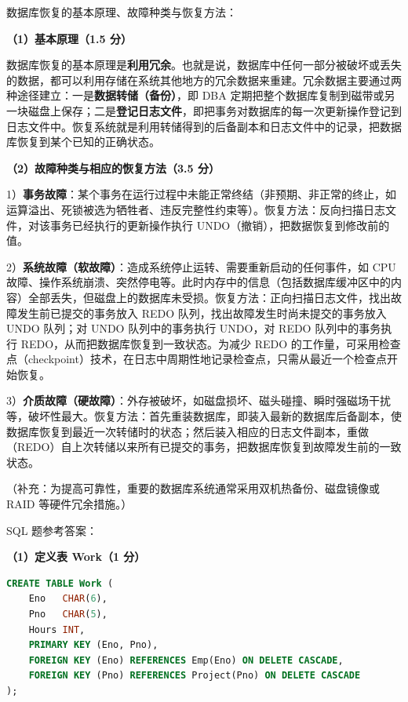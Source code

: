 \documentclass[a4paper,11pt]{article}
\begin{document}
\q 数据库恢复的基本原理、故障种类与恢复方法：
\begin{analysis}
\textbf{（1）基本原理（1.5 分）}

数据库恢复的基本原理是\textbf{利用冗余}。也就是说，数据库中任何一部分被破坏或丢失的数据，都可以利用存储在系统其他地方的冗余数据来重建。冗余数据主要通过两种途径建立：一是\textbf{数据转储（备份）}，即 DBA 定期把整个数据库复制到磁带或另一块磁盘上保存；二是\textbf{登记日志文件}，即把事务对数据库的每一次更新操作登记到日志文件中。恢复系统就是利用转储得到的后备副本和日志文件中的记录，把数据库恢复到某个已知的正确状态。

\textbf{（2）故障种类与相应的恢复方法（3.5 分）}

1）\textbf{事务故障}：某个事务在运行过程中未能正常终结（非预期、非正常的终止，如运算溢出、死锁被选为牺牲者、违反完整性约束等）。恢复方法：反向扫描日志文件，对该事务已经执行的更新操作执行 UNDO（撤销），把数据恢复到修改前的值。

2）\textbf{系统故障（软故障）}：造成系统停止运转、需要重新启动的任何事件，如 CPU 故障、操作系统崩溃、突然停电等。此时内存中的信息（包括数据库缓冲区中的内容）全部丢失，但磁盘上的数据库未受损。恢复方法：正向扫描日志文件，找出故障发生前已提交的事务放入 REDO 队列，找出故障发生时尚未提交的事务放入 UNDO 队列；对 UNDO 队列中的事务执行 UNDO，对 REDO 队列中的事务执行 REDO，从而把数据库恢复到一致状态。为减少 REDO 的工作量，可采用检查点（checkpoint）技术，在日志中周期性地记录检查点，只需从最近一个检查点开始恢复。

3）\textbf{介质故障（硬故障）}：外存被破坏，如磁盘损坏、磁头碰撞、瞬时强磁场干扰等，破坏性最大。恢复方法：首先重装数据库，即装入最新的数据库后备副本，使数据库恢复到最近一次转储时的状态；然后装入相应的日志文件副本，重做（REDO）自上次转储以来所有已提交的事务，把数据库恢复到故障发生前的一致状态。

（补充：为提高可靠性，重要的数据库系统通常采用双机热备份、磁盘镜像或 RAID 等硬件冗余措施。）
\end{analysis}


\q SQL 题参考答案：

\textbf{（1）定义表 Work（1 分）}
\begin{lstlisting}[language=SQL]
CREATE TABLE Work (
    Eno   CHAR(6),
    Pno   CHAR(5),
    Hours INT,
    PRIMARY KEY (Eno, Pno),
    FOREIGN KEY (Eno) REFERENCES Emp(Eno) ON DELETE CASCADE,
    FOREIGN KEY (Pno) REFERENCES Project(Pno) ON DELETE CASCADE
);
\end{lstlisting}
\end{document}
